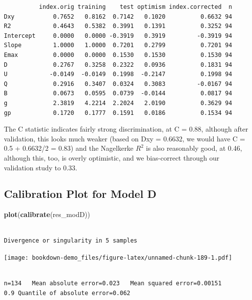\documentclass[]{book}
\newenvironment{Shaded}{\begin{snugshade}}{\end{snugshade}}
\newcommand{\KeywordTok}[1]{\textcolor[rgb]{0.13,0.29,0.53}{\textbf{#1}}}
\newcommand{\NormalTok}[1]{#1}
\theoremstyle{definition}
\theoremstyle{definition}
\theoremstyle{definition}
\theoremstyle{remark}
\begin{document}
\begin{verbatim}
          index.orig training    test optimism index.corrected  n
Dxy           0.7652   0.8162  0.7142   0.1020          0.6632 94
R2            0.4643   0.5382  0.3991   0.1391          0.3252 94
Intercept     0.0000   0.0000 -0.3919   0.3919         -0.3919 94
Slope         1.0000   1.0000  0.7201   0.2799          0.7201 94
Emax          0.0000   0.0000  0.1530   0.1530          0.1530 94
D             0.2767   0.3258  0.2322   0.0936          0.1831 94
U            -0.0149  -0.0149  0.1998  -0.2147          0.1998 94
Q             0.2916   0.3407  0.0324   0.3083         -0.0167 94
B             0.0673   0.0595  0.0739  -0.0144          0.0817 94
g             2.3819   4.2214  2.2024   2.0190          0.3629 94
gp            0.1720   0.1777  0.1591   0.0186          0.1534 94
\end{verbatim}

The C statistic indicates fairly strong discrimination, at C = 0.88,
although after validation, this looks much weaker (based on Dxy =
0.6632, we would have C = 0.5 + 0.6632/2 = 0.83) and the Nagelkerke
\(R^2\) is also reasonably good, at 0.46, although this, too, is overly
optimistic, and we bias-correct through our validation study to 0.33.

\subsection{Calibration Plot for Model
D}\label{calibration-plot-for-model-d}

\begin{Shaded}
\begin{Highlighting}[]
\KeywordTok{plot}\NormalTok{(}\KeywordTok{calibrate}\NormalTok{(res_modD))}
\end{Highlighting}
\end{Shaded}

\begin{verbatim}

Divergence or singularity in 5 samples
\end{verbatim}

\texttt{[image: bookdown-demo\_files/figure-latex/unnamed-chunk-189-1.pdf]}

\begin{verbatim}

n=134   Mean absolute error=0.023   Mean squared error=0.00151
0.9 Quantile of absolute error=0.062
\end{verbatim}
\end{document}
